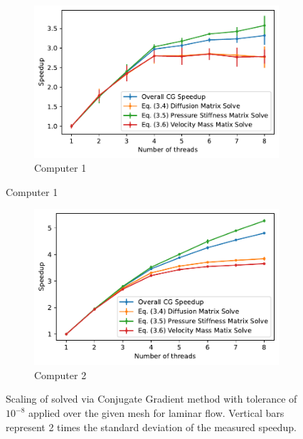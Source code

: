 \begin{figure}[H]
  \centering
  \begin{subfigure}[b]{0.8\textwidth}
      \centering
      \includegraphics[width=\textwidth]{Figures/LaminarCGSpeedUpC1.pdf}
      \caption{Computer 1}
  \end{subfigure}
\end{figure}
\begin{figure}[H]
	\centering
  \ContinuedFloat
  \begin{subfigure}[b]{0.8\textwidth}
      \centering
      \includegraphics[width=\textwidth]{Figures/LaminarCGSpeedUpC2.pdf}
      \caption{Computer 2}
  \end{subfigure}\caption{Scaling of  solved via Conjugate Gradient method with tolerance of $10^{-8}$ applied over the given mesh for laminar flow. Vertical bars represent 2 times the standard deviation of the measured speedup.}
  \label{fig:laminar-scaling}
\end{figure}



